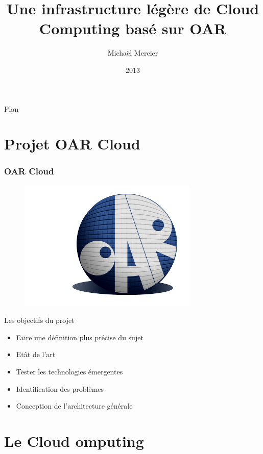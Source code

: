 \documentclass{beamer}
\title[OAR Cloud]{Une infrastructure légère de Cloud Computing basé sur OAR}
\institute{Polytech Grenoble, INRIA\\\scalebox{2}{\insertlogo}}
\author{Michaël Mercier}
\date{2013}
\begin{document}
	\begin{frame}
		\titlepage
	\end{frame}
	
	
	\begin{frame} 
		\begin{center}{\Large Plan }\end{center}
		\tableofcontents[hidesubsections]
	\end{frame}
	
	
  \section{Projet OAR Cloud}
		\begin{frame}
			\frametitle{OAR Cloud}
			\begin{figure}
			  \includegraphics[scale=0.3]{img/logo_oar.png}
 			\end{figure}
			Les objectifs du projet
			\begin{itemize}
			  \item Faire une définition plus précise du sujet
			  \item Etât de l'art
			  \item Tester les technologies émergentes
			  \item Identification des problèmes
			  \item Conception de l'architecture générale
			\end{itemize}			
		\end{frame}
			
			
			
	\section{Le Cloud omputing}
	
\end{document}
